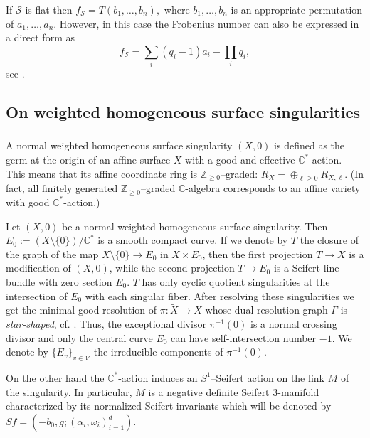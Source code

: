 \documentclass[oneside]{amsart}
\numberwithin{equation}{section}
\numberwithin{equation}{subsection}
\theoremstyle{plain}
\theoremstyle{definition}
\newcommand{\calv}{{\mathcal V}}
\newcommand{\calS}{{\mathcal S}}\newcommand{\cals}{{\bf s}}\newcommand{\calst}{{\bf st}}\newcommand{\cS}{{\mathcal S}}
\begin{document}
If $\calS$ is flat then $f_{\calS}=T(b_1,\dots,b_n),$ where $b_1,\dots,b_n$ is 
an appropriate permutation of $a_1,\dots,a_n$. However, in this case the Frobenius number can also be expressed in a direct form as 
\begin{equation}\label{eq:Frobflat}
f_{\calS}=\sum_i\left(q_i-1\right)a_i-\prod_i q_i,    
\end{equation}
see \cite[Thm. 2.5]{art_rch}.
\vskip 0.3cm

\subsection{On weighted homogeneous surface singularities}\label{ss:WHS}
\subsubsection{} A normal weighted homogeneous surface singularity $(X,0)$ is defined as the germ at the origin of an affine surface $X$ with a  good and effective  $\mathbb{C}^*$-action. This  means that its affine coordinate ring is $\mathbb{Z}_{\geq 0}$--graded: $R_X=\oplus_{\ell\geq 0} R_{X,\ell}$. (In fact, all finitely generated $\mathbb{Z}_{\geq 0}$--graded $\mathbb{C}$-algebra corresponds to an affine variety with good $\mathbb{C}^*$-action.)

Let $(X,0)$ be a normal weighted homogeneous surface singularity. Then $E_0:=(X\setminus\{0\})/\mathbb{C}^*$ is a smooth compact curve. If we denote by $T$ the closure of the graph of the map $X\setminus \{0\}\to E_0$ in $X\times E_0$, then the first projection $T\to X$ is a modification of $(X,0)$, while the second projection $T\to E_0$ is a Seifert line bundle with zero section $E_0$. $T$ has only cyclic quotient singularities at the intersection of $E_0$ with each singular fiber. After resolving these singularities we get the minimal good resolution of $\pi:\widetilde X\to X$ whose dual resolution graph $\Gamma$ is \textit{star-shaped}, cf. \cite{OW}. Thus, the exceptional divisor $\pi^{-1}(0)$ is a normal crossing divisor and only the central curve $E_0$ can have self-intersection number $-1$. We denote by $\{E_v\}_{v\in \calv}$ the irreducible components of $\pi^{-1}(0)$.

On the other hand the $\mathbb{C}^*$-action induces an $S^1$--Seifert action on the link $M$ of the singularity. In particular, $M$ is a negative definite Seifert 3-manifold characterized by its normalized Seifert invariants which will be denoted by $Sf=(-b_0,g;(\alpha_i,\omega_i)_{i=1}^d).$
\end{document}

